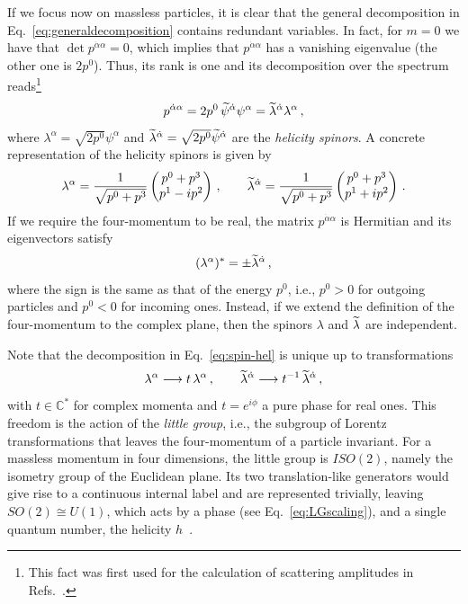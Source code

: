 If we focus now on massless particles, it is clear that the general decomposition in Eq.~\eqref{eq:generaldecomposition} contains redundant variables.
In fact, for $m=0$ we have that $\det p^{\dot\alpha\alpha} = 0$, which implies that $p^{\dot\alpha\alpha}$ has a vanishing eigenvalue (the other one is $2p^0$). Thus, its rank is one and its decomposition over the spectrum reads\footnote{This fact was first used for the calculation of scattering amplitudes in Refs.~\cite{Berends:1981rb,DeCausmaecker:1981jtq,Xu:1986xb,Gunion:1985vca}.}
\begin{equation}\label{eq:spin-hel}
    p^{\dot\alpha\alpha}=2p^0\,\widetilde{\psi}^{\dot\alpha}\psi^{\alpha} = \widetilde{\lambda}^{\dot\alpha}\lambda^{\alpha}\,,
\end{equation}
where
$\lambda^\alpha=\sqrt{2p^0}\psi^\alpha$ and $\widetilde{\lambda}^{\dot\alpha}=\sqrt{2p^0}\widetilde{\psi}^{\dot\alpha}$
are the \textit{helicity spinors}.
A concrete representation of the helicity spinors is given by
\begin{align}
    \lambda^\alpha = \frac{1}{\sqrt{p^0+p^3}}\begin{pmatrix}
        p^0+p^3 \\ p^1-ip^2
    \end{pmatrix}\,, \qquad
    \widetilde{\lambda}^{\dot\alpha} = \frac{1}{\sqrt{p^0+p^3}}\begin{pmatrix}
        p^0+p^3 \\ p^1+ip^2
    \end{pmatrix}\,.
\end{align}
If we require the four-momentum to be real, the matrix $p^{\dot\alpha\alpha}$ is Hermitian and its eigenvectors satisfy
\begin{equation}\label{eq:reality}
    (\lambda ^\alpha)^* = \pm\widetilde{\lambda} ^{\dot\alpha}\,,
\end{equation}
where the sign is the same as that of the energy $p^0$, i.e., $p^0 >0$ for outgoing particles and $p^0<0$ for incoming ones.
Instead, if we extend the definition of the four-momentum to the complex plane, then the spinors $\lambda$ and $\widetilde{\lambda}$ are independent.

Note that the decomposition in Eq.~\eqref{eq:spin-hel} is unique up to transformations
\begin{equation}
    \label{eq:LGscaling}
    \lambda^\alpha \longrightarrow t\,\lambda^\alpha\,,\qquad
    \widetilde{\lambda}^{\dot\alpha}\longrightarrow  t^{-1}\,\widetilde{\lambda}^{\dot\alpha}\,,
\end{equation}
with $t\in\mathbb C^*$ for complex momenta and $t=e^{i\phi}$ a pure phase for real ones.
This freedom is the action of the \textit{little group}, i.e., the subgroup of Lorentz transformations that leaves the four-momentum of a particle
invariant.
For a massless momentum in four dimensions, the little
group is $ISO(2)$, namely the isometry group of the Euclidean plane. Its two translation-like generators
would give rise to a continuous internal label and are represented trivially, leaving
$SO(2)\cong U(1)$, which acts by a phase (see Eq.~\eqref{eq:LGscaling}), and a
single quantum number, the helicity $h$~\cite{Wigner:1939cj,Bargmann:1948ck}.

